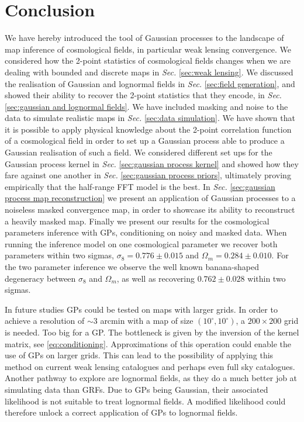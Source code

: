 \chapter{Conclusion}
We have hereby introduced the tool of Gaussian processes to the landscape of map inference of cosmological fields, in particular weak lensing convergence. We considered how the 2-point statistics of cosmological fields changes when we are dealing with bounded and discrete maps in \textit{Sec. }\ref{sec:weak lensing}. We discussed the realisation of Gaussian and lognormal fields in \textit{Sec. }\ref{sec:field generation}, and showed their ability to recover the 2-point statistics that they encode, in \textit{Sec. }\ref{sec:gaussian and lognormal fields}. We have included masking and noise to the data to simulate realistic maps in \textit{Sec. }\ref{sec:data simulation}. We have shown that it is possible to apply physical knowledge about the 2-point correlation function of a cosmological field in order to set up a Gaussian process able to produce a Gaussian realisation of such a field. We considered different set ups for the Gaussian process kernel in \textit{Sec. }\ref{sec:gaussian process kernel} and showed how they fare against one another in \textit{Sec. }\ref{sec:gaussian process priors}, ultimately proving empirically that the half-range FFT model is the best. In \textit{Sec. }\ref{sec:gaussian process map reconstruction} we present an application of Gaussian processes to a noiseless masked convergence map, in order to showcase its ability to reconstruct a heavily masked map. Finally we present our results for the cosmological parameters inference with GPs, conditioning on noisy and masked data. When running the inference model on one cosmological parameter we recover both parameters within two sigmas, $\sigma_8 = 0.776\pm0.015$ and $\Omega_m = 0.284\pm0.010$. For the two parameter inference we observe the well known banana-shaped degeneracy between $\sigma_8$ and $\Omega_m$, as well as recovering $0.762\pm0.028$ within two sigmas.

In future studies GPs could be tested on maps with larger grids. In order to achieve a resolution of $\sim 3$ arcmin with a map of size $(10^\circ,10^\circ)$, a $200\times200$ grid is needed. Too big for a GP. The bottleneck is given by the inversion of the kernel matrix, see \eqref{eq:conditioning}. Approximations of this operation could enable the use of GPs on larger grids. This can lead to the possibility of applying this method on current weak lensing catalogues and perhaps even full sky catalogues. Another pathway to explore are lognormal fields, as they do a much better job at simulating data than GRFs. Due to GPs being Gaussian, their associated likelihood is not suitable to treat lognormal fields. A modified likelihood could therefore unlock a correct application of GPs to lognormal fields.

